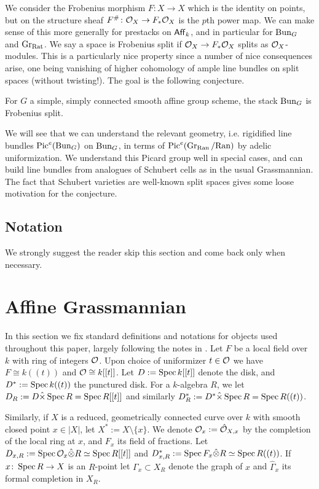 \documentclass[12pt]{article}
\begin{document}
We consider the Frobenius morphism $F \colon X \to X$ which is the identity on points, but on the structure sheaf $F^{\#}\colon \mathcal{O}_X \to F_* \mathcal{O}_X$ is the $p$th power map. We can make sense of this more generally for prestacks on $\operatorname{\mathsf{Aff}}_k$, and in particular for $\operatorname{Bun}_G$ and $\operatorname{Gr}_{\mathrm{Rat}}$. We say a space is Frobenius split if $\mathcal{O}_X \to F_* \mathcal{O}_X$ splits as $\mathcal{O}_X$-modules. This is a particularly nice property since a number of nice consequences arise, one being vanishing of higher cohomology of ample line bundles on split spaces (without twisting!). The goal is the following conjecture.
\begin{conj}
    For $G$ a simple, simply connected smooth affine group scheme, the stack $\operatorname{Bun}_G$ is Frobenius split.
\end{conj}
We will see that we can understand the relevant geometry, i.e. rigidified line bundles $\operatorname{Pic}^e(\operatorname{Bun}_G)$ on $\operatorname{Bun}_G$, in terms of $\operatorname{Pic}^e(\operatorname{Gr}_{\mathrm{Ran}}/\mathrm{Ran})$ by adelic uniformization. We understand this Picard group well in special cases, and can build line bundles from analogues of Schubert cells as in the usual Grassmannian. The fact that Schubert varieties are well-known split spaces gives some loose motivation for the conjecture.

\subsection{Notation}

We strongly suggest the reader skip this section and come back only when necessary.





\section{Affine Grassmannian}
In this section we fix standard definitions and notations for objects used throughout this paper, largely following the notes in \cite{zhu}. Let $F$ be a local field over $k$ with ring of integers $\mathcal{O}$. Upon choice of uniformizer $t \in \mathcal{O}$ we have $F \cong k((t))$ and $\mathcal{O} \cong k[[t]]$. Let $D := \operatorname{Spec} k[[t]]$ denote the disk, and $D^* := \operatorname{Spec} k((t))$ the punctured disk. For a $k$-algebra $R$, we let $D_R := D \hat{\times} \operatorname{Spec} R = \operatorname{Spec} R[[t]]$ and similarly $D^*_R := D^* \hat{\times} \operatorname{Spec} R = \operatorname{Spec} R((t))$. 

Similarly, if $X$ is a reduced, geometrically connected curve over $k$ with smooth closed point $x \in |X|$, let $X^* := X \setminus \{x\}$. We denote $\mathcal{O}_x := \hat{\mathcal{O}}_{X,x}$ by the completion of the local ring at $x$, and $F_x$ its field of fractions. Let $D_{x,R} := \operatorname{Spec} \mathcal{O}_x \hat{\otimes} R \simeq \operatorname{Spec} R[[t]]$ and $D_{x,R}^* := \operatorname{Spec} F_x \hat{\otimes} R \simeq \operatorname{Spec} R((t))$. If $x \colon \operatorname{Spec} R \to X$ is an $R$-point let $\Gamma_x \subset X_R$ denote the graph of $x$ and $\hat{\Gamma}_x$ its formal completion in $X_R$.
\end{document}

